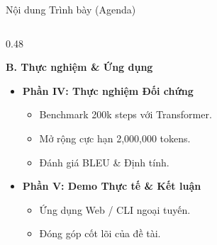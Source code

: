 \documentclass[aspectratio=169, 10pt]{beamer}
\begin{document}
\begin{frame}{Nội dung Trình bày (Agenda)}
\begin{columns}[t]
\begin{column}{0.48\textwidth}
\begin{block}{\textbf{B. Thực nghiệm \& Ứng dụng}}
\begin{itemize}
          \item \textbf{Phần IV: Thực nghiệm Đối chứng}
            \begin{itemize}
              \footnotesize
              \item Benchmark 200k steps với Transformer.
              \item Mở rộng cực hạn 2,000,000 tokens.
              \item Đánh giá BLEU \& Định tính.
            \end{itemize}
          \item \textbf{Phần V: Demo Thực tế \& Kết luận}
            \begin{itemize}
              \footnotesize
              \item Ứng dụng Web / CLI ngoại tuyến.
              \item Đóng góp cốt lõi của đề tài.
            \end{itemize}
        \end{itemize}
      \end{block}
    \end{column}
  \end{columns}
\end{frame}
\end{document}
